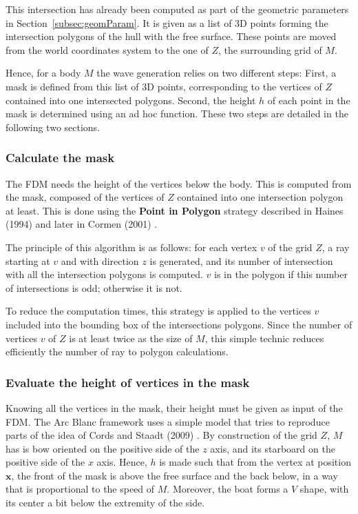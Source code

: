 \documentclass[final]{jcgt}
\def\Framework{The Arc Blanc framework\xspace}
\begin{document}
This intersection has already been computed as part of the geometric parameters in Section~\ref{subsec:geomParam}.
It is given as a list of 3D points forming the intersection polygons of the hull with the free surface.
These points are moved from the world coordinates system to the one of $Z$, the surrounding grid of $M$.

Hence, for a body $M$ the wave generation relies on two different steps:
First, a mask is defined from this list of 3D points, corresponding to the vertices of $Z$ contained into one intersected polygons.
Second, the height $h$ of each point in the mask is determined using an ad hoc function.
These two steps are detailed in the following two sections.

\subsubsection{Calculate the mask}
The FDM needs the height of the vertices below the body.
This is computed from the mask, composed of the vertices of $Z$ contained into one intersection polygon at least.
This is done using the \textbf{Point in Polygon} strategy described in Haines (1994) \cite{hainesPointPolygonStrategies1994} and later in Cormen (2001) \cite{CormenIntroductionAlgorithms2001}.

The principle of this algorithm is as follows:
for each vertex $v$ of the grid $Z$, a ray starting at $v$ and with direction $z$ is generated, and its number of intersection with all the intersection polygons is computed.
$v$ is in the polygon if this number of intersections is odd; otherwise it is not.

To reduce the computation times, this strategy is applied to the vertices $v$ included into the bounding box of the intersections polygons.
Since the number of vertices $v$ of $Z$ is at least twice as the size of $M$, this simple technic reduces efficiently the number of ray to polygon calculations.

\subsubsection{Evaluate the height of vertices in the mask}
\label{subsubsec:heightMask}
Knowing all the vertices in the mask, their height must be given as input of the FDM.
\Framework uses a simple model that tries to reproduce parts of the idea of Cords and Staadt (2009) \cite{cordsRealTimeOpenWater2009}.
By construction of the grid $Z$, $M$ has is bow oriented on the positive side of the $z$ axis, and its starboard on the positive side of the $x$ axis.
Hence, $h$ is made such that from the vertex at position $\mathbf x$, the front of the mask is above the free surface and the back below, in a way that is proportional to the speed of $M$.
Moreover, the boat forms a $V$ shape, with its center a bit below the extremity of the side.
\end{document}
